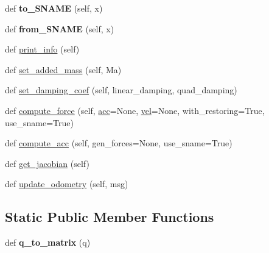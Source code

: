 \begin{DoxyCompactItemize}
\item 
\mbox{\label{classuuv__control__interfaces_1_1vehicle_1_1Vehicle_ac07467b30461b7f9d038ef9d7106c640}} 
def {\bfseries to\+\_\+\+S\+N\+A\+ME} (self, x)
\item 
\mbox{\label{classuuv__control__interfaces_1_1vehicle_1_1Vehicle_adc697eae992d91daf28b7e6a7de2038d}} 
def {\bfseries from\+\_\+\+S\+N\+A\+ME} (self, x)
\item 
def \hyperlink{classuuv__control__interfaces_1_1vehicle_1_1Vehicle_a97d737b2c8bce961fa433640f6abfa06}{print\+\_\+info} (self)
\item 
def \hyperlink{classuuv__control__interfaces_1_1vehicle_1_1Vehicle_a6d005052594343c0042293ab46a0907e}{set\+\_\+added\+\_\+mass} (self, Ma)
\item 
def \hyperlink{classuuv__control__interfaces_1_1vehicle_1_1Vehicle_a00377bec4259cddf133cb6ee3c32eccf}{set\+\_\+damping\+\_\+coef} (self, linear\+\_\+damping, quad\+\_\+damping)
\item 
def \hyperlink{classuuv__control__interfaces_1_1vehicle_1_1Vehicle_a35f52975f88fb4861a41351db7f8f4a6}{compute\+\_\+force} (self, \hyperlink{classuuv__control__interfaces_1_1vehicle_1_1Vehicle_a8f52a963cc009b0edc58706a5f3a8978}{acc}=None, \hyperlink{classuuv__control__interfaces_1_1vehicle_1_1Vehicle_abb4a52554737e5d33cea4060db7ca0ec}{vel}=None, with\+\_\+restoring=True, use\+\_\+sname=True)
\item 
def \hyperlink{classuuv__control__interfaces_1_1vehicle_1_1Vehicle_a0b8c08b744638cc91aec38be53ed143e}{compute\+\_\+acc} (self, gen\+\_\+forces=None, use\+\_\+sname=True)
\item 
def \hyperlink{classuuv__control__interfaces_1_1vehicle_1_1Vehicle_a7205bfe9869c9779e3d1872d7bbae5ab}{get\+\_\+jacobian} (self)
\item 
def \hyperlink{classuuv__control__interfaces_1_1vehicle_1_1Vehicle_a2191d660f52d7e7c73cdd278a0f0923b}{update\+\_\+odometry} (self, msg)
\end{DoxyCompactItemize}
\subsection*{Static Public Member Functions}
\begin{DoxyCompactItemize}
\item 
\mbox{\label{classuuv__control__interfaces_1_1vehicle_1_1Vehicle_aa4aee971cc1e8c232b530a4786799cb8}} 
def {\bfseries q\+\_\+to\+\_\+matrix} (q)
\end{DoxyCompactItemize}
